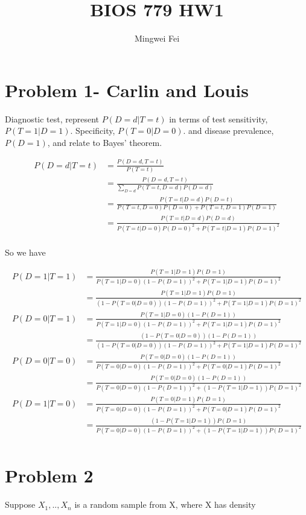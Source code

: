 \documentclass[11pt]{article} %
\title{BIOS 779 HW1}
\author{Mingwei Fei}
\begin{document}
\maketitle

\section{Problem 1- Carlin and Louis}
Diagnostic test, represent $P(D=d|T=t)$ in terms of test sensitivity, $P(T=1|D=1)$. Specificity, $P(T= 0|D= 0)$. and disease prevalence, $P(D=1)$, and relate to Bayes' theorem.
 
\begin{align*}
	P(D=d|T=t) &= \frac{P(D=d, T=t)}{P(T=t)} \\
	&= \frac{P(D=d, T=t)}{\sum_{D=d} P(T=t, D=d) P(D=d)} \\
	&= \frac{P(T=t|D=d) P(D=t)}{P(T=t, D=0)P(D=0) + P(T=t, D=1)P(D=1)}\\
	&= \frac{P(T=t|D=d) P(D=d)}{P(T=t|D=0)P(D=0)^2 + P(T=t|D=1)P(D=1)^2} \\
\end{align*}

So we have

\begin{align*}
P(D= 1|T= 1) &= \frac{P(T= 1|D= 1) P(D=1)}{P(T=1|D=0)(1- P(D=1))^2 + P(T=1|D=1)P(D=1)^2} \\
&=  \frac{P(T= 1|D= 1) P(D=1)}{(1- P(T=0|D=0))(1- P(D=1))^2 + P(T=1|D=1)P(D=1)^2} \\
P(D= 0|T= 1) &= \frac{P(T= 1|D= 0) (1-P(D=1))}{P(T=1|D=0)(1- P(D=1))^2 + P(T=1|D=1)P(D=1)^2} \\
&=  \frac{(1- P(T=0|D=0)) (1-P(D=1))}{(1- P(T=0|D=0))(1- P(D=1))^2 + P(T=1|D=1)P(D=1)^2} \\
P(D= 0|T= 0) &= \frac{P(T= 0|D= 0) (1-P(D=1))}{P(T=0|D=0)(1- P(D=1))^2 + P(T=0|D=1)P(D=1)^2} \\
&=  \frac{P(T=0|D=0) (1-P(D=1))}{ P(T=0|D=0)(1- P(D=1))^2 + (1- P(T=1|D=1)) P(D=1)^2} \\
P(D= 1|T= 0) &= \frac{P(T= 0|D= 1) P(D=1)}{P(T=0|D=0)(1- P(D=1))^2 + P(T=0|D=1)P(D=1)^2} \\
&=  \frac{ (1- P(T=1|D=1)) P(D=1)}{ P(T=0|D=0)(1- P(D=1))^2 + (1- P(T=1|D=1)) P(D=1)^2} \\
\end{align*}

\section{Problem 2}
Suppose $X_1, .., X_n$ is a random sample from X, where X has density 
\end{document}
